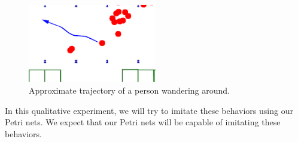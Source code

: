 \documentclass[11pt, a4paper]{book}
\begin{document}
\begin{figure}
\centering
\includegraphics[width=0.5\textwidth]{"./qualitative experiment pictures/wander_tracked_cropped"}
\caption{Approximate trajectory of a person wandering around.}
\label{fig:reallifewandertrajectory}
\end{figure}


In this qualitative experiment, we will try to imitate these behaviors using our Petri nets. We expect that our Petri nets will be capable of imitating these behaviors.





\end{document}
